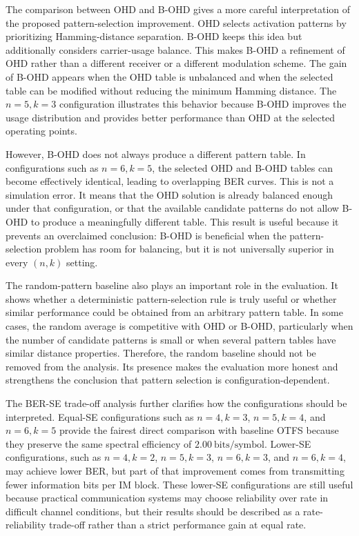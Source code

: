 The comparison between OHD and B-OHD gives a more careful interpretation of the proposed pattern-selection improvement. OHD selects activation patterns by prioritizing Hamming-distance separation. B-OHD keeps this idea but additionally considers carrier-usage balance. This makes B-OHD a refinement of OHD rather than a different receiver or a different modulation scheme. The gain of B-OHD appears when the OHD table is unbalanced and when the selected table can be modified without reducing the minimum Hamming distance. The \(n=5,k=3\) configuration illustrates this behavior because B-OHD improves the usage distribution and provides better performance than OHD at the selected operating points.

However, B-OHD does not always produce a different pattern table. In configurations such as \(n=6,k=5\), the selected OHD and B-OHD tables can become effectively identical, leading to overlapping BER curves. This is not a simulation error. It means that the OHD solution is already balanced enough under that configuration, or that the available candidate patterns do not allow B-OHD to produce a meaningfully different table. This result is useful because it prevents an overclaimed conclusion: B-OHD is beneficial when the pattern-selection problem has room for balancing, but it is not universally superior in every \((n,k)\) setting.

The random-pattern baseline also plays an important role in the evaluation. It shows whether a deterministic pattern-selection rule is truly useful or whether similar performance could be obtained from an arbitrary pattern table. In some cases, the random average is competitive with OHD or B-OHD, particularly when the number of candidate patterns is small or when several pattern tables have similar distance properties. Therefore, the random baseline should not be removed from the analysis. Its presence makes the evaluation more honest and strengthens the conclusion that pattern selection is configuration-dependent.

The BER-SE trade-off analysis further clarifies how the configurations should be interpreted. Equal-SE configurations such as \(n=4,k=3\), \(n=5,k=4\), and \(n=6,k=5\) provide the fairest direct comparison with baseline OTFS because they preserve the same spectral efficiency of \(2.00~\text{bits/symbol}\). Lower-SE configurations, such as \(n=4,k=2\), \(n=5,k=3\), \(n=6,k=3\), and \(n=6,k=4\), may achieve lower BER, but part of that improvement comes from transmitting fewer information bits per IM block. These lower-SE configurations are still useful because practical communication systems may choose reliability over rate in difficult channel conditions, but their results should be described as a rate-reliability trade-off rather than a strict performance gain at equal rate.

